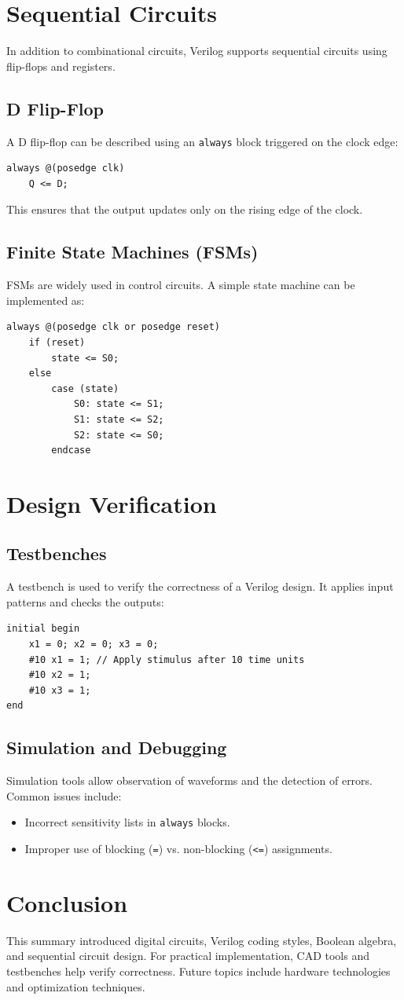\documentclass{article}
\begin{document}
\section{Sequential Circuits}
In addition to combinational circuits, Verilog supports sequential circuits using flip-flops and registers.

\subsection{D Flip-Flop}
A D flip-flop can be described using an \texttt{always} block triggered on the clock edge:
\begin{lstlisting}
always @(posedge clk)
    Q <= D;
\end{lstlisting}
This ensures that the output updates only on the rising edge of the clock.

\subsection{Finite State Machines (FSMs)}
FSMs are widely used in control circuits. A simple state machine can be implemented as:
\begin{lstlisting}
always @(posedge clk or posedge reset)
    if (reset) 
        state <= S0;
    else 
        case (state)
            S0: state <= S1;
            S1: state <= S2;
            S2: state <= S0;
        endcase
\end{lstlisting}

\section{Design Verification}
\subsection{Testbenches}
A testbench is used to verify the correctness of a Verilog design. It applies input patterns and checks the outputs:
\begin{lstlisting}
initial begin
    x1 = 0; x2 = 0; x3 = 0;
    #10 x1 = 1; // Apply stimulus after 10 time units
    #10 x2 = 1;
    #10 x3 = 1;
end
\end{lstlisting}

\subsection{Simulation and Debugging}
Simulation tools allow observation of waveforms and the detection of errors. Common issues include:
\begin{itemize}
    \item Incorrect sensitivity lists in \texttt{always} blocks.
    \item Improper use of blocking (\texttt{=}) vs. non-blocking (\texttt{<=}) assignments.
\end{itemize}

\section{Conclusion}
This summary introduced digital circuits, Verilog coding styles, Boolean algebra, and sequential circuit design. For practical implementation, CAD tools and testbenches help verify correctness. Future topics include hardware technologies and optimization techniques.
\end{document}
